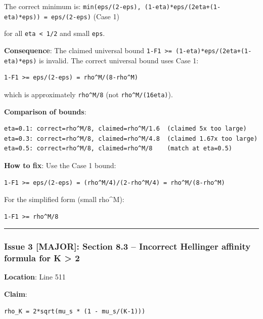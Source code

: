 \documentclass[
  12pt,
]{article}
\begin{document}
The correct minimum is:
\texttt{min(eps/(2-eps),\ (1-eta)*eps/(2eta+(1-eta)*eps))\ =\ eps/(2-eps)}
(Case 1)

for all \texttt{eta\ \textless{}\ 1/2} and small \texttt{eps}.

\textbf{Consequence}: The claimed universal bound
\texttt{1-F1\ \textgreater{}=\ (1-eta)*eps/(2eta+(1-eta)*eps)} is
invalid. The correct universal bound uses Case 1:

\begin{verbatim}
1-F1 >= eps/(2-eps) = rho^M/(8-rho^M)
\end{verbatim}

which is approximately \texttt{rho\^{}M/8} (not
\texttt{rho\^{}M/(16eta)}).

\textbf{Comparison of bounds}:

\begin{verbatim}
eta=0.1: correct=rho^M/8, claimed=rho^M/1.6  (claimed 5x too large)
eta=0.3: correct=rho^M/8, claimed=rho^M/4.8  (claimed 1.67x too large)
eta=0.5: correct=rho^M/8, claimed=rho^M/8    (match at eta=0.5)
\end{verbatim}

\textbf{How to fix}: Use the Case 1 bound:

\begin{verbatim}
1-F1 >= eps/(2-eps) = (rho^M/4)/(2-rho^M/4) = rho^M/(8-rho^M)
\end{verbatim}

For the simplified form (small rho\^{}M):

\begin{verbatim}
1-F1 >= rho^M/8
\end{verbatim}

\begin{center}\rule{0.5\linewidth}{0.5pt}\end{center}

\subsubsection{Issue 3 {[}MAJOR{]}: Section 8.3 -- Incorrect Hellinger
affinity formula for K \textgreater{}
2}\label{issue-3-major-section-8.3-incorrect-hellinger-affinity-formula-for-k-2}

\textbf{Location}: Line 511

\textbf{Claim}:

\begin{verbatim}
rho_K = 2*sqrt(mu_s * (1 - mu_s/(K-1)))
\end{verbatim}
\end{document}
